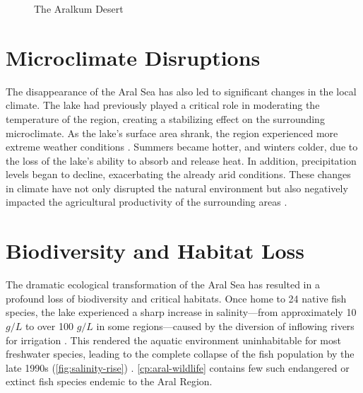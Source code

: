 \begin{figure}
    \centering
    \caption{The Aralkum Desert}
    \label{fig:aralkum-desert}
\end{figure}

\section{Microclimate Disruptions}
The disappearance of the Aral Sea has also led to significant changes in the local climate. The lake had previously played a critical role in moderating the temperature of the region, creating a stabilizing effect on the surrounding microclimate. As the lake's surface area shrank, the region experienced more extreme weather conditions \autocite{narbayep_aral}. Summers became hotter, and winters colder, due to the loss of the lake's ability to absorb and release heat. In addition, precipitation levels began to decline, exacerbating the already arid conditions. These changes in climate have not only disrupted the natural environment but also negatively impacted the agricultural productivity of the surrounding areas \autocite{huseynli_aralcatastrophe}. 

\section{Biodiversity and Habitat Loss}
The dramatic ecological transformation of the Aral Sea has resulted in a profound loss of biodiversity and critical habitats. Once home to 24 native fish species, the lake experienced a sharp increase in salinity—from approximately 10 $g/L$ to over 100 $g/L$ in some regions—caused by the diversion of inflowing rivers for irrigation \autocite{schettler_hydrochemical}. This rendered the aquatic environment uninhabitable for most freshwater species, leading to the complete collapse of the fish population by the late 1990s (\autoref{fig:salinity-rise}) \autocite{gleick_araldeath}\autocite{aladin_zoocenosis_2019}. \autoref{cp:aral-wildlife} contains few such endangered or extinct fish species endemic to the Aral Region.

